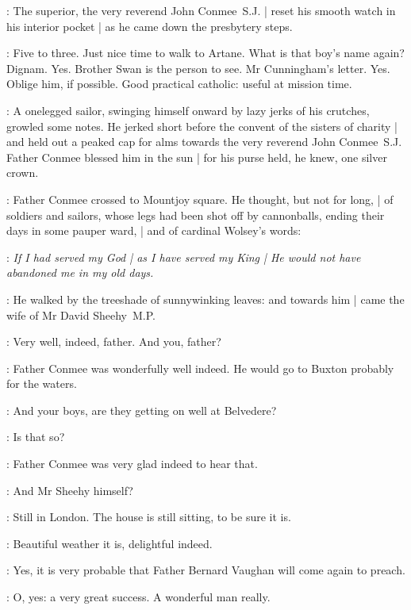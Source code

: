 :
The superior, the very reverend John Conmee~S.J. |
reset his smooth watch in his interior pocket |
as he came down the presbytery steps.

\conmeeint:
Five to three.
Just nice time to walk to Artane.
What is that boy's name again?
Dignam.
Yes.
Brother Swan is the person to see.
Mr Cunningham's letter.
Yes.
Oblige him, if possible.
Good practical catholic:
useful at mission time.


:
A onelegged sailor,
swinging himself onward by lazy jerks of his crutches,
growled some notes.
He jerked short before the convent of the sisters of charity |
and held out a peaked cap for alms
towards the very reverend John Conmee~S.J.
Father Conmee blessed him in the sun |
for his purse held,
he knew,
one silver crown.


:
Father Conmee crossed to Mountjoy square.
He thought,
but not for long, |
of soldiers and sailors,
whose legs had been shot off by cannonballs,
ending their days in some pauper ward, |
and of cardinal Wolsey's words:

\conmeeint:
\emph{If I had served my God |
as I have served my King |
He would not have abandoned me in my old days.}

:
He walked by the treeshade of sunnywinking leaves:
and towards him |
came the wife of Mr David Sheehy~M.P.


\mrssheehy:
Very well, indeed, father.
And you, father?

:
Father Conmee was wonderfully well indeed.
He would go to Buxton probably for the waters.

\conmee:
And your boys, are they getting on well at Belvedere?

\conmee:
Is that so?

:
Father Conmee was very glad indeed to hear that.

\conmee:
And Mr Sheehy himself?

\mrssheehy:
Still in London.
The house is still sitting, to be sure it is.

\mrssheehy:
Beautiful weather it is, delightful indeed.

\conmee:
Yes, it is very probable that Father Bernard Vaughan will come again to preach.

\conmee:
O, yes: a very great success.
A wonderful man really.

